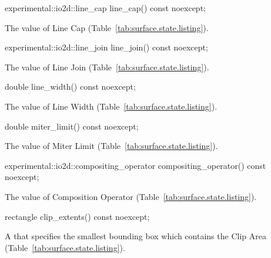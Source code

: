 \begin{itemdecl}
experimental::io2d::line_cap line_cap() const noexcept;
\end{itemdecl}
\begin{itemdescr}
\pnum
\returns
The value of Line Cap (Table~\ref{tab:surface.state.listing}).
\end{itemdescr}

\begin{itemdecl}
experimental::io2d::line_join line_join() const noexcept;
\end{itemdecl}
\begin{itemdescr}
\pnum
\returns
The value of Line Join (Table~\ref{tab:surface.state.listing}).
\end{itemdescr}

\begin{itemdecl}
double line_width() const noexcept;
\end{itemdecl}
\begin{itemdescr}
\pnum
\returns
The value of Line Width (Table~\ref{tab:surface.state.listing}).
\end{itemdescr}

\begin{itemdecl}
double miter_limit() const noexcept;
\end{itemdecl}
\begin{itemdescr}
\pnum
\returns
The value of Miter Limit (Table~\ref{tab:surface.state.listing}).
\end{itemdescr}

\begin{itemdecl}
experimental::io2d::compositing_operator compositing_operator() const
  noexcept;
\end{itemdecl}
\begin{itemdescr}
\pnum
\returns
The value of Composition Operator (Table~\ref{tab:surface.state.listing}).
\end{itemdescr}

\begin{itemdecl}
rectangle clip_extents() const noexcept;
\end{itemdecl}
\begin{itemdescr}
\pnum
\returns
A  that specifies the smallest bounding box which contains the Clip Area (Table~\ref{tab:surface.state.listing}).
\end{itemdescr}

